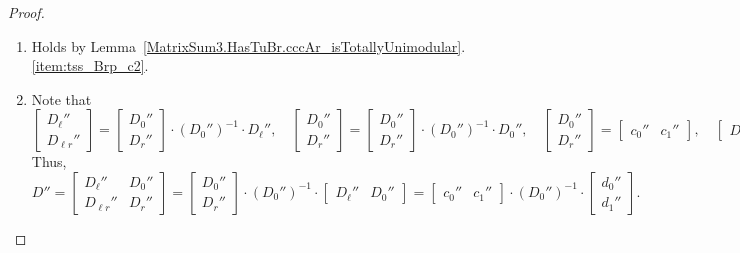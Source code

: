 \begin{proof}
    \begin{enumerate}
        \item Holds by Lemma~\ref{MatrixSum3.HasTuBr.cccAr_isTotallyUnimodular}.\ref{item:tss_Brp_c2}.

        \item Note that
        \[
            \begin{bmatrix} D_{\ell}'' \\ D_{\ell r}'' \end{bmatrix} = \begin{bmatrix} D_{0}'' \\ D_{r}'' \end{bmatrix} \cdot (D_{0}'')^{-1} \cdot D_{\ell}'', \quad
            \begin{bmatrix} D_{0}'' \\ D_{r}'' \end{bmatrix} = \begin{bmatrix} D_{0}'' \\ D_{r}'' \end{bmatrix} \cdot (D_{0}'')^{-1} \cdot D_{0}'', \quad
            \begin{bmatrix} D_{0}'' \\ D_{r}'' \end{bmatrix} = \begin{bmatrix} c_{0}'' & c_{1}'' \end{bmatrix}, \quad
            \begin{bmatrix} D_{\ell}'' & D_{0}'' \end{bmatrix} = \begin{bmatrix} d_{0}'' \\ d_{1}'' \end{bmatrix}.
        \]
        Thus,
        \[
            D''
            = \begin{bmatrix} D_{\ell}'' & D_{0}'' \\ D_{\ell r}'' & D_{r}'' \end{bmatrix}
            = \begin{bmatrix} D_{0}'' \\ D_{r}'' \end{bmatrix} \cdot (D_{0}'')^{-1} \cdot \begin{bmatrix} D_{\ell}'' & D_{0}'' \end{bmatrix}
            = \begin{bmatrix} c_{0}'' & c_{1}'' \end{bmatrix} \cdot (D_{0}'')^{-1} \cdot \begin{bmatrix} d_{0}'' \\ d_{1}'' \end{bmatrix}.
\]
\end{enumerate}
\end{proof}
